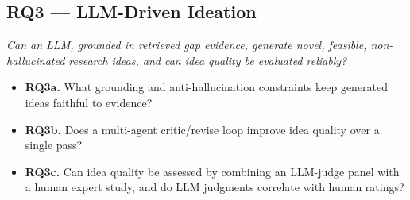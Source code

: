 \subsection{RQ3 --- LLM-Driven Ideation}
\emph{Can an LLM, grounded in retrieved gap evidence, generate novel, feasible,
non-hallucinated research ideas, and can idea quality be evaluated reliably?}
\begin{itemize}
  \item \textbf{RQ3a.} What grounding and anti-hallucination constraints keep
        generated ideas faithful to evidence?
  \item \textbf{RQ3b.} Does a multi-agent critic/revise loop improve idea quality
        over a single pass?
  \item \textbf{RQ3c.} Can idea quality be assessed by combining an LLM-judge
        panel with a human expert study, and do LLM judgments correlate with human
        ratings?
\end{itemize}
